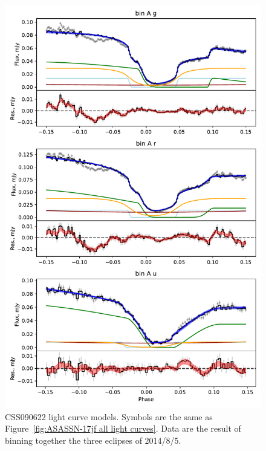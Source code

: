 \begin{figure}
    \centering
    \includegraphics[width=\textwidth]{figures/results/CSS090622/CSS090622_1.pdf}
    \caption{CSS090622 light curve models. Symbols are the same as Figure~\ref{fig:ASASSN-17jf all light curves}. Data are the result of binning together the three eclipses of 2014/8/5.}
    \label{fig:CSS090622 all light curves}
\end{figure}
